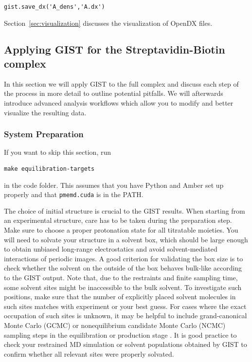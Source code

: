\documentclass[9pt,tutorial]{livecoms}
\newcommand{\software}{\texttt}
\begin{document}
\begin{lstlisting}[style=python]
gist.save_dx('A_dens','A.dx')
\end{lstlisting}
Section~\ref{sec:visualization} discusses the visualization of OpenDX files.

\subsection{Applying GIST for the Streptavidin-Biotin complex}
\label{subsec:gist_complex}
In this section we will apply GIST to the full complex and discuss each step of the process in more detail to outline potential pitfalls. We will afterwards introduce advanced analysis workflows which allow you to modify and better visualize the resulting data.
\subsubsection{System Preparation}
If you want to skip this section, run 
\begin{lstlisting}[style=bash]
make equilibration-targets
\end{lstlisting}
in the code folder. This assumes that you have Python and Amber set up properly and that \software{pmemd.cuda} is in the PATH.

The choice of initial structure is crucial to the GIST results.
When starting from an experimental structure, care has to be taken during the preparation step.
Make sure to choose a proper protonation state for all titratable moieties.
You will need to solvate your structure in a solvent box, which should be large enough to obtain unbiased long-range electrostatics and avoid solvent-mediated interactions of periodic images.
A good criterion for validating the box size is to check whether the solvent on the outside of the box behaves bulk-like according to the GIST output.
Note that, due to the restraints and finite sampling time, some solvent sites might be inaccessible to the bulk solvent.
To investigate such positions, make sure that the number of explicitly placed solvent molecules in such sites matches with experiment or your best guess. 
For cases where the exact occupation of such sites is unknown, it may be helpful to include grand-canonical Monte Carlo (GCMC) or nonequilibrium candidate Monte Carlo (NCMC) sampling steps in the equilibration or production stage \cite{Ge-GCMC2022,Melling-NCMC2023}.
It is good practice to check your restrained MD simulation or solvent populations obtained by GIST to confirm whether all relevant sites were properly solvated.
\end{document}
